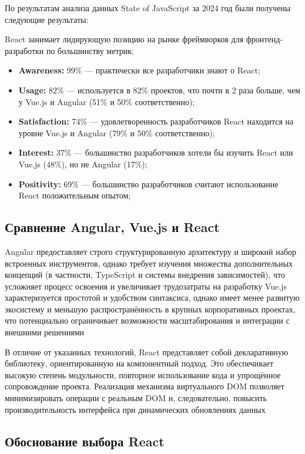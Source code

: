 По результатам анализа данных State of JavaScript за 2024 год были получены следующие результаты:

React занимает лидирующую позицию на рынке фреймворков для фронтенд-разработки по большинству метрик:

\begin{itemize}
	\item \textbf{Awareness:} 99\% --- практически все разработчики знают о React;
	\item \textbf{Usage:} 82\% --- используется в 82\% проектов, что почти в 2 раза больше, чем у Vue.js и Angular (51\% и 50\% соответственно);
	\item \textbf{Satisfaction:} 74\% --- удовлетворенность разработчиков React находится на уровне Vue.js и Angular (79\% и 50\% соответственно);
	\item \textbf{Interest:} 37\% --- большинство разработчиков хотели бы изучить React или Vue.js (48\%), но не Angular (17\%);
	\item \textbf{Positivity:} 69\% --- большинство разработчиков считают использование React положительным опытом;
\end{itemize}


\subsection*{Сравнение Angular, Vue.js и React}

Angular предоставляет строго структурированную архитектуру и широкий набор
встроенных инструментов, однако требует изучения множества дополнительных концепций
(в частности, TypeScript и системы внедрения зависимостей), что усложняет процесс освоения и увеличивает трудозатраты на разработку
Vue.js характеризуется простотой и удобством синтаксиса, однако имеет менее развитую
экосистему и меньшую распространённость в крупных корпоративных проектах, что
потенциально ограничивает возможности масштабирования и интеграции с внешними решениями

В отличие от указанных технологий, React представляет собой декларативную библиотеку,
ориентированную на компонентный подход. Это обеспечивает высокую степень модульности, 
повторное использование кода и упрощённое сопровождение проекта. Реализация 
механизма виртуального DOM позволяет минимизировать операции с реальным DOM
и, следовательно, повысить производительность интерфейса при динамических обновлениях данных \cite{}

\subsection{Обоснование выбора React}

